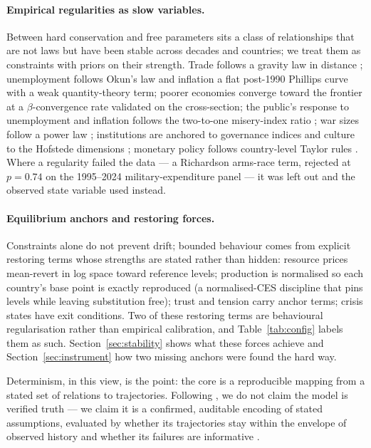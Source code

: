 \documentclass[12pt,a4paper]{article}
\begin{document}
\paragraph{Empirical regularities as slow variables.} Between hard conservation and free
parameters sits a class of relationships that are not laws but have been stable across decades
and countries; we treat them as constraints with priors on their strength. Trade follows a
gravity law in distance \citep{headmayer2014}; unemployment follows Okun's law
\citep{okun1962} and inflation a flat post-1990 Phillips curve \citep{phillips1958} with a weak
quantity-theory term; poorer economies converge toward the frontier at a $\beta$-convergence
rate validated on the cross-section; the public's response to unemployment and inflation
follows the two-to-one misery-index ratio \citep{ditella2001}; war sizes follow a power law
\citep{richardson1948,clauset2009}; institutions are anchored to governance indices and culture
to the Hofstede dimensions \citep{kaufmann2011,hofstede2010}; monetary policy follows
country-level Taylor rules \citep{taylor1993}. Where a regularity failed the data --- a
Richardson arms-race term, rejected at $p=0.74$ on the 1995--2024 military-expenditure panel
--- it was left out and the observed state variable used instead.

\paragraph{Equilibrium anchors and restoring forces.} Constraints alone do not prevent drift;
bounded behaviour comes from explicit restoring terms whose strengths are stated rather than
hidden: resource prices mean-revert in log space toward reference levels; production is
normalised so each country's base point is exactly reproduced (a normalised-CES discipline
that pins levels while leaving substitution free); trust and tension carry anchor terms;
crisis states have exit conditions. Two of these restoring terms are behavioural
regularisation rather than empirical calibration, and Table~\ref{tab:config} labels them as
such. Section~\ref{sec:stability} shows what these forces achieve and
Section~\ref{sec:instrument} how two missing anchors were found the hard way.

Determinism, in this view, is the point: the core is a reproducible mapping from a stated set
of relations to trajectories. Following \citet{oreskes1994}, we do not claim the model is
verified truth --- we claim it is a confirmed, auditable encoding of stated assumptions,
evaluated by whether its trajectories stay within the envelope of observed history and whether
its failures are informative \citep{saltelli2020}.
\end{document}

